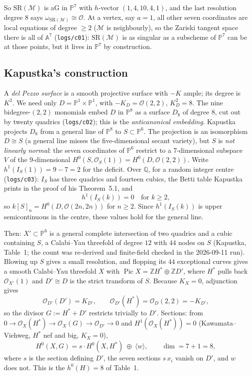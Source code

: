 \documentclass[10pt,a4paper]{article}
\theoremstyle{plain}
\theoremstyle{definition}
\theoremstyle{remark}
\begin{document}
So $\mathrm{SR}(\mathcal{M})$ is aG in $\mathbb{P}^7$ with
$h$-vector $(1,4,10,4,1)$, and the last resolution degree $8$ says
$\omega_{\mathrm{SR}(\mathcal{M})}\cong\mathcal{O}$. At a vertex,
say $a=1$, all other seven coordinates are local equations of
degree $\ge 2$ ($\mathcal{M}$ is neighbourly), so the Zariski
tangent space there is all of $\mathbb{A}^7$ (\texttt{logs/c01}):
$\mathrm{SR}(\mathcal{M})$ is as singular as a subscheme of
$\mathbb{P}^7$ can be at those points, but it lives in
$\mathbb{P}^7$ by construction.

\subsection*{Kapustka's construction}
A \emph{del Pezzo surface} is a smooth projective surface with
$-K$ ample; its degree is $K^2$. We need only
$D=\mathbb{P}^1\times\mathbb{P}^1$, with $-K_D=\mathcal{O}(2,2)$,
$K_D^2=8$. The nine bidegree-$(2,2)$ monomials embed $D$ in
$\mathbb{P}^8$ as a surface $D_8$ of degree $8$, cut out by twenty
quadrics (\texttt{logs/c02}); this is the \emph{anticanonical
embedding}. Kapustka projects $D_8$ from a general line of
$\mathbb{P}^8$ to $S\subset\mathbb{P}^6$. The projection is an
isomorphism $D\cong S$ (a general line misses the five-dimensional
secant variety), but $S$ is \emph{not linearly normal}: the seven
coordinates of $\mathbb{P}^6$ restrict to a $7$-dimensional subspace
$V$ of the $9$-dimensional $H^0(S,\mathcal{O}_S(1))=H^0(D,\mathcal{O}(2,2))$.
Write $h^1(I_S(1))=9-7=2$ for the deficit. Over $\mathbb{Q}$, for a
random integer centre (\texttt{logs/c03}): $I_S$ has three quadrics
and fourteen cubics, the Betti table Kapustka prints in the proof of
his Theorem~5.1, and
$$
h^1(I_S(k))=0\quad\text{for } k\ge 2 ,
$$
so $k[S]_n=H^0(D,\mathcal{O}(2n,2n))$ for $n\ge 2$. Since
$h^1(I_S(k))$ is upper semicontinuous in the centre, these values
hold for the general line.

Then: $X'\subset\mathbb{P}^6$ is a general complete intersection of
two quadrics and a cubic containing $S$, a Calabi--Yau threefold of
degree $12$ with $44$ nodes on $S$ (Kapustka, Table~1; the count was
re-derived and finite-field checked in the 2026-09-11 run).
Blowing up $S$ gives a small resolution, and flopping its $44$
exceptional curves gives a smooth Calabi--Yau threefold $X$ with
$\operatorname{Pic}X=\mathbb{Z}H^*\oplus\mathbb{Z}D'$, where $H^*$
pulls back $\mathcal{O}_{X'}(1)$ and $D'\cong D$ is the strict
transform of $S$. Because $K_X=0$, adjunction gives
$$
\mathcal{O}_{D'}(D')=K_{D'},\qquad
\mathcal{O}_{D'}(H^*)=\mathcal{O}_D(2,2)=-K_{D'},
$$
so the divisor $G:=H^*+D'$ restricts trivially to $D'$.
Sections: from $0\to\mathcal{O}_X(H^*)\to\mathcal{O}_X(G)\to
\mathcal{O}_{D'}\to 0$ and $H^1(\mathcal{O}_X(H^*))=0$ (Kawamata--Viehweg,
$H^*$ nef and big, $K_X=0$),
$$
H^0(X,G)=s\cdot H^0(X,H^*)\ \oplus\ \langle w\rangle ,\qquad
\dim=7+1=8,
$$
where $s$ is the section defining $D'$, the seven sections
$s\,x_i$ vanish on $D'$, and $w$ does not. This is the $h^0(H)=8$
of Table~1.
\end{document}
